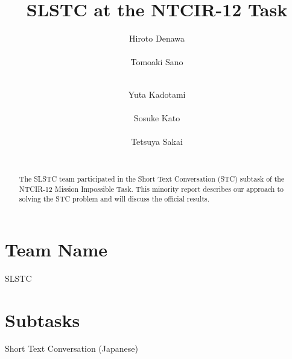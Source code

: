 \documentclass{../style/sig-alternate}
\begin{document}
\title{SLSTC at the NTCIR-12 Task}

\author{
%
%
\alignauthor
Hiroto Denawa\\
       \\
\alignauthor
Tomoaki Sano\\
       \\
\and  %
\alignauthor
Yuta Kadotami\\
       \\
\alignauthor
Sosuke Kato\\
       \\
\alignauthor
Tetsuya Sakai\\
       \\
}

\maketitle

\begin{abstract}
The SLSTC team participated in the Short Text Conversation (STC) subtask of the NTCIR-12 Mission Impossible Task.
This minority report describes our approach to solving the STC problem and will discuss the official results.
\end{abstract}

\section*{Team Name}
SLSTC

\section*{Subtasks}
Short Text Conversation (Japanese)
\end{document}
